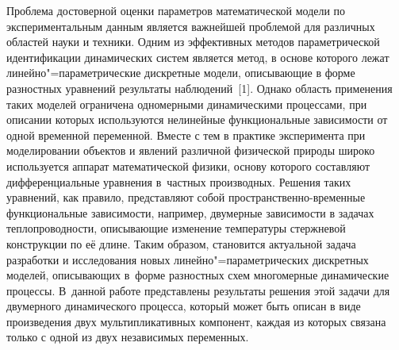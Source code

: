 



\date{26/II/2010} %



\maketitle

Проблема достоверной оценки параметров математической модели по экспериментальным данным является важнейшей проблемой для различных областей науки и техники. 
Одним из эффективных методов параметрической идентификации динамических систем является метод, в основе которого лежат линейно"=параметрические дискретные модели, описывающие в форме разностных уравнений результаты наблюдений~[1]. 
Однако область применения таких моделей ограничена одномерными динамическими процессами, при описании которых используются нелинейные функциональные зависимости от одной временной переменной. 
Вместе с тем в практике эксперимента при моделировании объектов и явлений различной физической природы широко используется аппарат математической физики, основу которого составляют дифференциальные уравнения в~частных производных. 
Решения таких уравнений, как правило, представляют собой пространственно-временные функциональные зависимости, например, двумерные зависимости в задачах теплопроводности, описывающие изменение температуры стержневой конструкции по её длине. 
Таким образом, становится актуальной задача разработки и исследования новых линейно"=параметрических дискретных моделей, описывающих в~форме разностных схем многомерные динамические процессы. 
В~данной работе представлены результаты решения этой задачи для двумерного динамического процесса, который может быть описан в виде произведения двух мультипликативных компонент, каждая из которых связана только с одной из двух независимых переменных.

